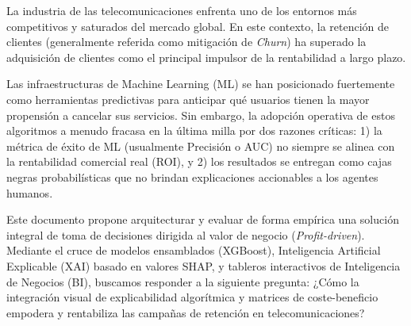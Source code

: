 La industria de las telecomunicaciones enfrenta uno de los entornos más competitivos y saturados del mercado global. En este contexto, la retención de clientes (generalmente referida como mitigación de \textit{Churn}) ha superado la adquisición de clientes como el principal impulsor de la rentabilidad a largo plazo. 

Las infraestructuras de Machine Learning (ML) se han posicionado fuertemente como herramientas predictivas para anticipar qué usuarios tienen la mayor propensión a cancelar sus servicios. Sin embargo, la adopción operativa de estos algoritmos a menudo fracasa en la última milla por dos razones críticas: 1) la métrica de éxito de ML (usualmente Precisión o AUC) no siempre se alinea con la rentabilidad comercial real (ROI), y 2) los resultados se entregan como cajas negras probabilísticas que no brindan explicaciones accionables a los agentes humanos.

Este documento propone arquitecturar y evaluar de forma empírica una solución integral de toma de decisiones dirigida al valor de negocio (\textit{Profit-driven}). Mediante el cruce de modelos ensamblados (XGBoost), Inteligencia Artificial Explicable (XAI) basado en valores SHAP, y tableros interactivos de Inteligencia de Negocios (BI), buscamos responder a la siguiente pregunta: ¿Cómo la integración visual de explicabilidad algorítmica y matrices de coste-beneficio empodera y rentabiliza las campañas de retención en telecomunicaciones?
